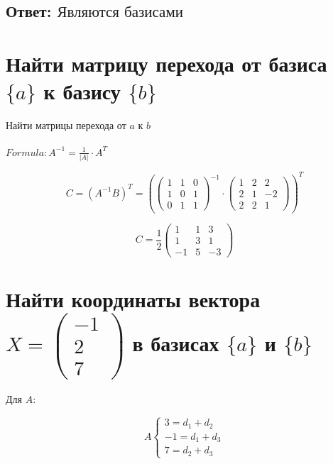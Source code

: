 \documentclass{article}
\begin{document}
         \subsection{Ответ: $\textbf{Являются базисами}$}
        
        \vspace{0.8cm}
       
         \section{Найти матрицу перехода от базиса $\{a\}$ к базису $\{b\}$} 
        
        Найти матрицы перехода от \( a \) к \( b \) \\ \\
        \(   Formula: A^{-1} = \frac{1}{|A|} \cdot A^T \)
    
        \[
        C = \left( A^{-1} B \right)^T = 
        \left( \begin{pmatrix} 
        1 & 1 & 0 \\
        1 & 0 & 1 \\
        0 & 1 & 1
        \end{pmatrix}^{-1} 
        \cdot
        \begin{pmatrix} 
        1 & 2 & 2 \\
        2 & 1 & -2 \\
        2 & 2 & 1
        \end{pmatrix} \right)^T
        \]
        
        \[
       C = \frac{1}{2} 
        \begin{pmatrix} 
        1 & 1 & 3 \\
        1 & 3 & 1 \\
        -1 & 5 & -3
        \end{pmatrix}
        \]
        
        \vspace{0.6cm}
        \section{Найти координаты вектора $X = \begin{pmatrix} -1 \\ 2 \\ 7 \end{pmatrix}$ в базисах $\{a\}$ и $\{b\}$} 
        
        Для \( A \):
        
        \[
        A\begin{cases} 
        3 = d_{1} + d_{2} \\
        -1 = d_{1} + d_{3} \\
        7 = d_{2} + d_{3}
        \end{cases}
        \]
        
\end{document}
